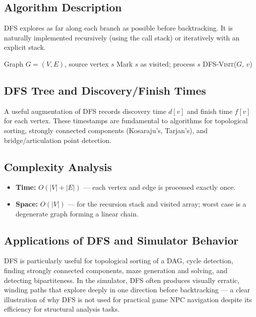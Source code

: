 \documentclass[12pt, a4paper, oneside]{report}
\theoremstyle{definition}
\begin{document}
\subsection{Algorithm Description}

DFS explores as far along each branch as possible before backtracking. It is naturally implemented recursively (using the call stack) or iteratively with an explicit stack.

\begin{algorithm}[H]
\caption{Depth-First Search (Recursive)}
\label{alg:dfs}
\begin{algorithmic}[1]
\Require Graph $G = (V, E)$, source vertex $s$
\State Mark $s$ as visited; process $s$
        \State \textsc{DFS-Visit}($G$, $v$)
    \EndIf
\EndFor
\end{algorithmic}
\end{algorithm}

\subsection{DFS Tree and Discovery/Finish Times}

A useful augmentation of DFS records discovery time $d[v]$ and finish time $f[v]$ for each vertex. These timestamps are fundamental to algorithms for topological sorting, strongly connected components (Kosaraju's, Tarjan's), and bridge/articulation point detection.

\subsection{Complexity Analysis}

\begin{itemize}
    \item \textbf{Time:} $O(|V| + |E|)$ — each vertex and edge is processed exactly once.
    \item \textbf{Space:} $O(|V|)$ — for the recursion stack and visited array; worst case is a degenerate graph forming a linear chain.
\end{itemize}

\subsection{Applications of DFS and Simulator Behavior}

DFS is particularly useful for topological sorting of a DAG, cycle detection, finding strongly connected components, maze generation and solving, and detecting bipartiteness. In the simulator, DFS often produces visually erratic, winding paths that explore deeply in one direction before backtracking — a clear illustration of why DFS is not used for practical game NPC navigation despite its efficiency for structural analysis tasks.
\end{document}
